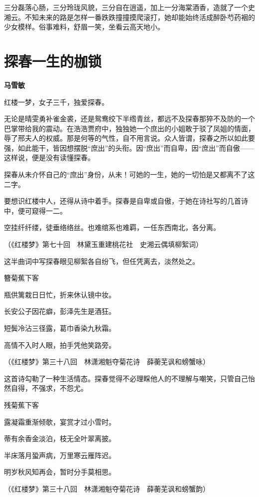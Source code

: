 \documentclass[openany,scheme = chinese, linespread = 1.5]{ctexbook}
\newcommand \name[1]{\begin{center} \kaishu \Large \bfseries #1 \end{center}}
\begin{document}
三分磊落心肠，三分玲珑风貌，三分自在逍遥，加上一分海棠酒香，造就了一个史湘云。不知未来的路是怎样一番跌跌撞撞摸爬滚打，她却能始终活成醉卧芍药裀的少女模样。俗事难料，舒眉一笑，坐看云高天地小。

\newpage
\section{探春一生的枷锁}
\name{马雪敏}

红楼一梦，女子三千，独爱探春。

无论是晴雯勇补雀金裘，还是鸳鸯绞下半绺青丝，都远不及探春那猝不及防的一个巴掌带给我的震动。在浩浩贾府中，独独她一个庶出的小姐敢于驳了凤姐的情面，辱了邢夫人的权威。那是何等的气性，自不用言说。众人皆谓，探春之所以如此要强，如此能干，皆因想摆脱“庶出”的头衔。因“庶出”而自卑，因“庶出”而自傲——这样说，便是没有读懂探春。

探春从未介怀自己的“庶出”身份，从未！可她的一生，她的一切怕是又都离不了这二字。

要想识红楼中人，还得从诗中着手。探春是自卑或自傲，于她在诗社写的几首诗中，便可窥得一二。
\begin{center}

空挂纤纤缕，徒垂络络丝。也难绾系也难羁，一任东西南北，各分离。

（《红楼梦》第七十回　林黛玉重建桃花社　史湘云偶填柳絮词）

\end{center}

这半曲词中写探春眼见柳絮各自纷飞，但任凭离去，淡然处之。
\begin{center}
簪菊蕉下客

瓶供篱栽日日忙，折来休认镜中妆。

长安公子因花癖，彭泽先生是酒狂。

短鬓冷沾三径露，葛巾香染九秋霜。

高情不入时人眼，拍手凭他笑路旁。

（《红楼梦》第三十八回　林潇湘魁夺菊花诗　薛蘅芜讽和螃蟹咏）
\end{center}

这首诗勾勒了一种生活情态。探春觉得不必理睬他人的不理解与嘲笑，只管自己怡然自得，不强求，不怨尤。
\begin{center}

残菊蕉下客

露凝霜重渐倾欹，宴赏才过小雪时。

蒂有余香金淡泊，枝无全叶翠离披。

半床落月蛩声病，万里寒云雁阵迟。

明岁秋风知再会，暂时分手莫相思。

（《红楼梦》第三十八回　林潇湘魁夺菊花诗　薛蘅芜讽和螃蟹韵）

\end{center}
\end{document}
